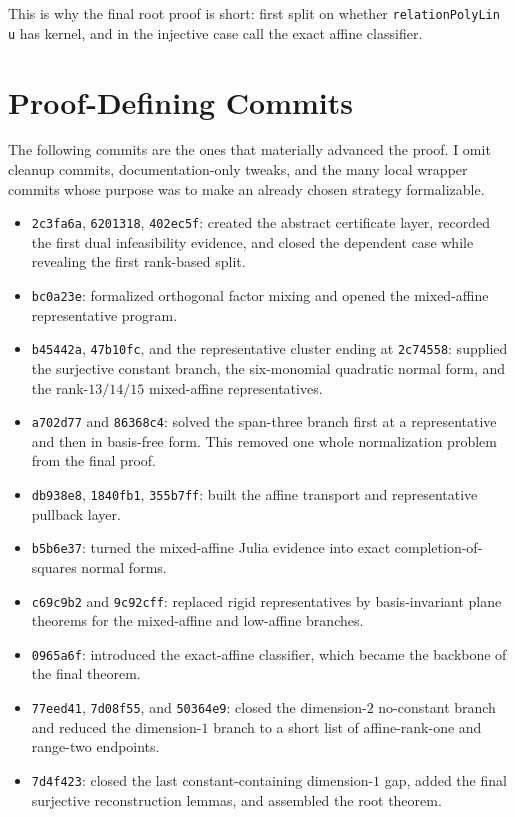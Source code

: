 \documentclass[10pt]{article}
\begin{document}
This is why the final root proof is short: first split on whether
\texttt{relationPolyLin u} has kernel, and in the injective case call the exact
affine classifier.

\section*{Proof-Defining Commits}
The following commits are the ones that materially advanced the proof. I omit
cleanup commits, documentation-only tweaks, and the many local wrapper commits
whose purpose was to make an already chosen strategy formalizable.

\small
\begin{itemize}
\item \texttt{2c3fa6a}, \texttt{6201318}, \texttt{402ec5f}: created the
abstract certificate layer, recorded the first dual infeasibility evidence, and
closed the dependent case while revealing the first rank-based split.
\item \texttt{bc0a23e}: formalized orthogonal factor mixing and opened the
mixed-affine representative program.
\item \texttt{b45442a}, \texttt{47b10fc}, and the representative cluster ending
at \texttt{2c74558}: supplied the surjective constant branch, the six-monomial
quadratic normal form, and the rank-$13/14/15$ mixed-affine representatives.
\item \texttt{a702d77} and \texttt{86368c4}: solved the span-three branch first
at a representative and then in basis-free form. This removed one whole
normalization problem from the final proof.
\item \texttt{db938e8}, \texttt{1840fb1}, \texttt{355b7ff}: built the affine
transport and representative pullback layer.
\item \texttt{b5b6e37}: turned the mixed-affine Julia evidence into exact
completion-of-squares normal forms.
\item \texttt{c69c9b2} and \texttt{9c92cff}: replaced rigid representatives by
basis-invariant plane theorems for the mixed-affine and low-affine branches.
\item \texttt{0965a6f}: introduced the exact-affine classifier, which became
the backbone of the final theorem.
\item \texttt{77eed41}, \texttt{7d08f55}, and \texttt{50364e9}: closed the
dimension-$2$ no-constant branch and reduced the dimension-$1$ branch to a
short list of affine-rank-one and range-two endpoints.
\item \texttt{7d4f423}: closed the last constant-containing dimension-$1$ gap,
added the final surjective reconstruction lemmas, and assembled the root
theorem.
\end{itemize}
\normalsize
\end{document}
